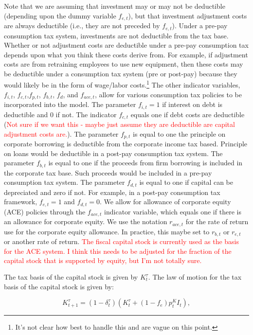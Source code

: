 \noindent\noindent Note that we are assuming that investment may or may not be deductible (depending upon the dummy variable $f_{e,t}$), but that investment adjustment costs are always deductible (i.e., they are not preceded by $f_{e,t}$).  Under a pre-pay consumption tax system, investments are not deductible from the tax base.  Whether or not adjustment costs are deductible under a pre-pay consumption tax depends upon what you think these costs derive from.  For example, if adjustment costs are from retraining employees to use new equipment, then these costs may be deductible under a consumption tax system (pre or post-pay) because they would likely be in the form of wage/labor costs.\footnote{It's not clear how best to handle this and \citet{DZ2013} are vague on this point.}  The other indicator variables, $f_{i,t}$, $f_{c,t}$,$f_{p,t}$, $f_{b,t}$, $f_{d}$, and $f_{ace,t}$, allow for various consumption tax policies to be incorporated into the model.  The parameter $f_{i,t}=1$ if interest on debt is deductible and 0 if not.  The indicator $f_{c,t}$ equals one if debt costs are deductible (\textcolor{red}{Not sure if we want this - maybe just assume they are deductible are capital adjustment costs are.}).  The parameter $f_{p,t}$ is equal to one the principle on corporate borrowing is deductible from the corporate income tax based.  Principle on loans would be deductible in a post-pay consumption tax system.  The parameter $f_{b,t}$ is equal to one if the proceeds from firm borrowing is included in the corporate tax base.  Such proceeds would be included in a pre-pay consumption tax system.  The parameter $f_{d,t}$ is equal to one if capital can be depreciated and zero if not.  For example, in a post-pay consumption tax framework, $f_{e,t}=1$ and $f_{d,t}=0$. We allow for allowance of corporate equity (ACE) policies through the $f_{ace,t}$ indicator variable, which equals one if there is an allowance for corporate equity.  We use the notation $r_{ace,t}$ for the rate of return use for the corporate equity allowance.  In practice, this maybe set to $r_{b,t}$ or $r_{e,t}$ or another rate of return. \textcolor{red}{The fiscal capital stock is currently used as the basis for the ACE system.  I think this needs to be adjusted for the fraction of the capital stock that is supported by equity, but I'm not totally sure.}

The tax basis of the capital stock is given by $K^{\tau}_{t}$.  The law of motion for the tax basis of the capital stock is given by:

\begin{equation}
\label{eqn:lom_taxcapital}
K^{\tau}_{t+1}=(1-\delta^{\tau}_{t})(K^{\tau}_{t} + (1-f_{e})p^{K}_{t}I_{t}),
\end{equation}

